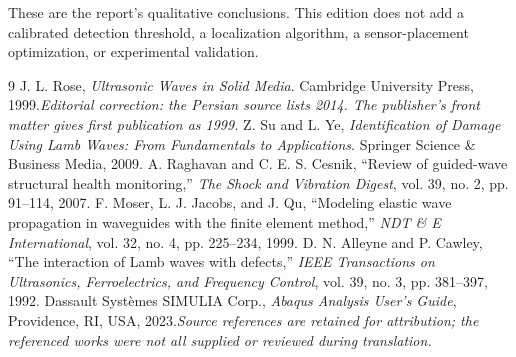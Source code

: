 \documentclass[11pt,a4paper]{article}
\begin{document}
These are the report's qualitative conclusions. This edition does not add a calibrated detection threshold, a localization algorithm, a sensor-placement optimization, or experimental validation.
\clearpage
\begin{thebibliography}{9}
 J. L. Rose, \emph{Ultrasonic Waves in Solid Media}. Cambridge University Press, 1999.\newline\textit{Editorial correction: the Persian source lists 2014. The publisher's front matter gives first publication as 1999.}
 Z. Su and L. Ye, \emph{Identification of Damage Using Lamb Waves: From Fundamentals to Applications}. Springer Science \& Business Media, 2009.
 A. Raghavan and C. E. S. Cesnik, ``Review of guided-wave structural health monitoring,'' \emph{The Shock and Vibration Digest}, vol. 39, no. 2, pp. 91--114, 2007.
 F. Moser, L. J. Jacobs, and J. Qu, ``Modeling elastic wave propagation in waveguides with the finite element method,'' \emph{NDT \& E International}, vol. 32, no. 4, pp. 225--234, 1999.
 D. N. Alleyne and P. Cawley, ``The interaction of Lamb waves with defects,'' \emph{IEEE Transactions on Ultrasonics, Ferroelectrics, and Frequency Control}, vol. 39, no. 3, pp. 381--397, 1992.
 Dassault Syst\`emes SIMULIA Corp., \emph{Abaqus Analysis User's Guide}, Providence, RI, USA, 2023.\newline\textit{Source references are retained for attribution; the referenced works were not all supplied or reviewed during translation.}
\end{thebibliography}
\appendix\clearpage
\end{document}
